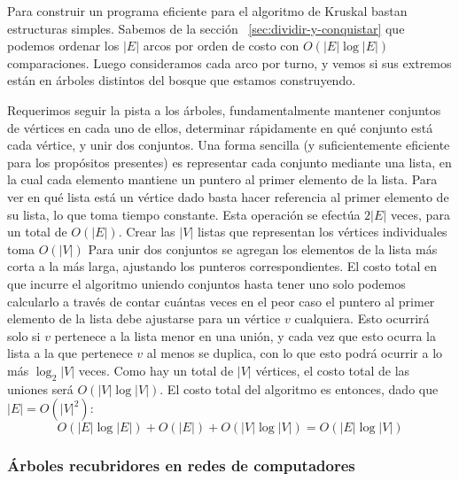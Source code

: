  Para construir un programa eficiente para el algoritmo de Kruskal
  bastan estructuras simples.
  Sabemos de la sección~%
    \ref{sec:dividir-y-conquistar}
  que podemos ordenar los \(\lvert E \rvert\)
  arcos por orden de costo
  con \(O(\lvert E \rvert \log \lvert E \rvert)\) comparaciones.
  Luego consideramos cada arco por turno,
  y vemos si sus extremos están en árboles distintos del bosque
  que estamos construyendo.

  Requerimos seguir la pista a los árboles,
  fundamentalmente mantener conjuntos de vértices
  en cada uno de ellos,
  determinar rápidamente en qué conjunto está cada vértice,
  y unir dos conjuntos.
  Una forma sencilla
  (y suficientemente eficiente para los propósitos presentes)
  es representar cada conjunto mediante una lista,
  en la cual cada elemento
  mantiene un puntero al primer elemento de la lista.
  Para ver en qué lista está un vértice dado
  basta hacer referencia al primer elemento de su lista,
  lo que toma tiempo constante.
  Esta operación se efectúa \(2 \lvert E \rvert\) veces,
  para un total de \(O(\lvert E \rvert)\).
  Crear las \(\lvert V \rvert\) listas
  que representan los vértices individuales
  toma \(O(\lvert V \rvert)\)
  Para unir dos conjuntos
  se agregan los elementos de la lista más corta a la más larga,
  ajustando los punteros correspondientes.
  El costo total en que incurre el algoritmo
  uniendo conjuntos hasta tener uno solo
  podemos calcularlo
  a través de contar cuántas veces en el peor caso
  el puntero al primer elemento de la lista debe ajustarse
  para un vértice \(v\) cualquiera.
  Esto ocurrirá solo si \(v\) pertenece a la lista menor
  en una unión,
  y cada vez que esto ocurra la lista a la que pertenece \(v\)
  al menos se duplica,
  con lo que esto podrá ocurrir
  a lo más \(\log_2 \lvert V \rvert\) veces.
  Como hay un total de \(\lvert V \rvert\) vértices,
  el costo total de las uniones
  será \(O(\lvert V \rvert \log \lvert V \rvert)\).
  El costo total del algoritmo es entonces,
  dado que \(\lvert E \rvert = O(\lvert V \rvert^2)\):
  \begin{equation*}
    O(\lvert E \rvert \log \lvert E \rvert)
      + O(\lvert E \rvert)
      + O(\lvert V \rvert \log \lvert V \rvert)
      = O(\lvert E \rvert \log \lvert V \rvert)
  \end{equation*}

\subsubsection{Árboles recubridores en redes de computadores}
\label{sec:STP}

